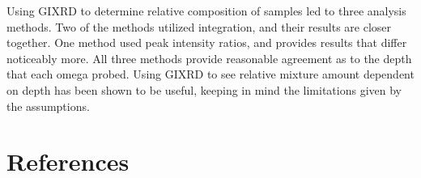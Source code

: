 \documentclass{article}
\begin{document}
    Using GIXRD to determine relative composition of samples led to three analysis methods. Two of the methods utilized integration, and their results are closer together. One method used peak intensity ratios, and provides results that differ noticeably more. All three methods provide reasonable agreement as to the depth that each omega probed. Using GIXRD to see relative mixture amount dependent on depth has been shown to be useful, keeping in mind the limitations given by the assumptions.
    
\section{References}

% 
\end{document}

